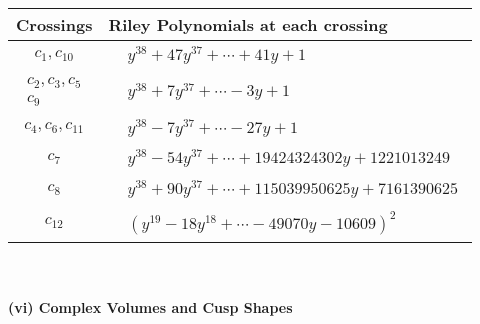 \documentclass[1p]{elsarticle_modified}
\theoremstyle{definition}
\begin{document}
\begin{tabular}{m{50pt}|m{274pt}}
Crossings & \hspace{64pt}Riley Polynomials at each crossing \\
\hline $$\begin{aligned}c_{1},c_{10}\end{aligned}$$&$\begin{aligned}
&y^{38}+47 y^{37}+\cdots+41 y+1
\end{aligned}$\\
\hline $$\begin{aligned}c_{2},c_{3},c_{5}\\c_{9}\end{aligned}$$&$\begin{aligned}
&y^{38}+7 y^{37}+\cdots-3 y+1
\end{aligned}$\\
\hline $$\begin{aligned}c_{4},c_{6},c_{11}\end{aligned}$$&$\begin{aligned}
&y^{38}-7 y^{37}+\cdots-27 y+1
\end{aligned}$\\
\hline $$\begin{aligned}c_{7}\end{aligned}$$&$\begin{aligned}
&y^{38}-54 y^{37}+\cdots+19424324302 y+1221013249
\end{aligned}$\\
\hline $$\begin{aligned}c_{8}\end{aligned}$$&$\begin{aligned}
&y^{38}+90 y^{37}+\cdots+115039950625 y+7161390625
\end{aligned}$\\
\hline $$\begin{aligned}c_{12}\end{aligned}$$&$\begin{aligned}
&(y^{19}-18 y^{18}+\cdots-49070 y-10609)^{2}
\end{aligned}$\\
\hline
\end{tabular}\\~\\
\newpage\flushleft \textbf{(vi) Complex Volumes and Cusp Shapes}
\end{document}
